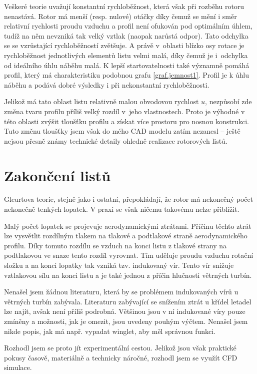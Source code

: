 Veškeré teorie uvažují konstantní rychloběžnost, která však při rozběhu rotoru nenastává. Rotor má menší (resp. nulové) otáčky díky čemuž se mění i směr relativní rychlosti proudu vzduchu a profil není ofukován pod optimálním úhlem, tudíž na něm nevzniká tak velký vztlak (naopak narůstá odpor). Tato odchylka se se vzrůstající rychloběžností zvětšuje. A právě v~oblasti blízko osy rotace je rychloběžnost jednotlivých elementů listu velmi malá, díky čemuž je i~odchylka od ideálního úhlu náběhu malá. K lepší startovatelnosti také významně pomáhá profil, který má charakteristiku podobnou grafu \ref{graf.jemnost1}. Profil je  k úhlu náběhu a podává dobré výsledky i při nekonstantní rychloběžnosti.

Jelikož má tato oblast listu relativně malou obvodovou rychlost $u$, nezpůsobí zde změna tvaru profilu příliš velký rozdíl v~jeho vlastnostech. Proto je výhodné v této oblasti zvýšit tloušťku profilu a získat více prostoru pro nosnou konstrukci. Tuto změnu tloušťky jsem však do mého CAD modelu zatím nezanesl – ještě nejsou přesně známy technické detaily ohledně realizace rotorových listů.

\section{Zakončení listů}
Gleurtova teorie, stejně jako i ostatní, přepokládají, že rotor má nekonečný počet nekonečně tenkých lopatek. V praxi se však ničemu takovému nelze přiblížit.

Malý počet lopatek se projevuje aerodynamickými ztrátami. Příčinu těchto ztrát lze vysvětlit rozdílným tlakem na tlakové a podtlakové straně aerodynamického profilu. Díky tomuto rozdílu se vzduch na konci listu  z tlakové strany na podtlakovou ve snaze tento rozdíl vyrovnat. Tím uděluje proudu vzduchu rotační složku a na konci lopatky tak vzniká tzv. indukovaný vír. Tento vír snižuje vztlakovou sílu na konci listu a je také jednou z příčin hlučnosti větrných turbín.

Nenašel jsem žádnou literaturu, která by se problémem indukovaných vírů u větrných turbín zabývala. Literaturu zabývající se snížením ztrát u křídel letadel lze najít, avšak není příliš podrobná. Většinou jsou v ní indukované víry pouze zmíněny a možnosti, jak je omezit, jsou uvedeny pouhým výčtem. Nenašel jsem nikde popis, jak má např. vypadat winglet, aby měl správnou funkci.

Rozhodl jsem se proto jít experimentální cestou. Jelikož jsou však praktické pokusy časově, materiálně a technicky náročné, rozhodl jsem se využít CFD simulace.

